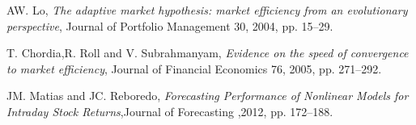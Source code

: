 \begin{thebibliography}{9}
AW. Lo, \textit{The adaptive market hypothesis: market efficiency from an evolutionary perspective}, Journal of
Portfolio Management 30, 2004, pp. 15–29.


T. Chordia,R. Roll and V. Subrahmanyam, \textit{Evidence on the speed of convergence to market efficiency}, Journal of
Financial Economics 76, 2005, pp. 271–292.

JM. Matias and JC. Reboredo, \textit{Forecasting Performance of Nonlinear Models for Intraday Stock Returns},Journal of Forecasting ,2012, pp. 172–188. 
\end{thebibliography}